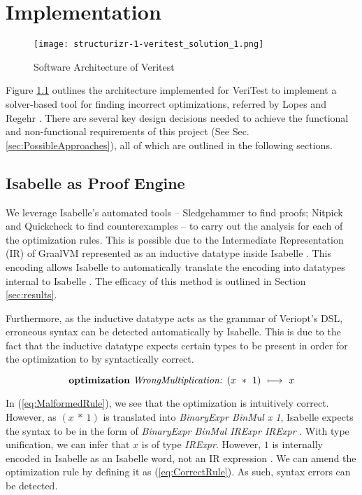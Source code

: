 \chapter{Implementation \label{sec:implementation}}

\begin{figure}[h]
    \centering
    \texttt{[image: structurizr-1-veritest\_solution\_1.png]}
    \caption{Software Architecture of Veritest}
    \label{fig:architecture}
\end{figure}

Figure \ref{fig:architecture} outlines the architecture implemented for VeriTest to implement a solver-based tool for finding incorrect optimizations,
referred by Lopes and Regehr \cite[p. 5]{CompilerOptimization}. There are several key design decisions needed to achieve the functional and 
non-functional requirements of this project (See Sec. \ref{sec:PossibleApproaches}), all of which are outlined in the following sections.

\section{Isabelle as Proof Engine}
\label{sec:ProofEngine}

We leverage Isabelle's automated tools -- Sledgehammer to find proofs; Nitpick and Quickcheck to find counterexamples --
to carry out the analysis for each of the optimization rules. This is possible due to the Intermediate 
Representation (IR) of GraalVM represented as an inductive datatype inside Isabelle \cite[Sec. 3]{ATVA21_GraalVM_IR_Semantics}. 
This encoding allows Isabelle to automatically translate the encoding into datatypes internal to Isabelle \cite{biendarra_ning_2024}.
The efficacy of this method is outlined in Section \ref{sec:results}.

Furthermore, as the inductive datatype acts as the grammar of Veriopt's DSL, erroneous syntax can be detected automatically by Isabelle.
This is due to the fact that the inductive datatype expects certain types to be present in order for the optimization to by syntactically correct.

\begin{equation}
    \text{\textbf{optimization} \emph{WrongMultiplication: \((x\ *\ 1)\ \longmapsto\ x\)}}
    \label{eq:MalformedRule}
\end{equation}

In (\ref{eq:MalformedRule}), we see that the optimization is intuitively correct. However, as \((x\ *\ 1)\) is translated into 
\emph{BinaryExpr BinMul x 1}, Isabelle expects the syntax to be in the form of \emph{BinaryExpr BinMul IRExpr IRExpr} 
\cite[Definition 1]{Term_Graph_Optimizations}. With type unification, we can infer that \(x\) is of type \emph{IRExpr}. However, \(1\) is 
internally encoded in Isabelle as an Isabelle word, not an IR expression \cite[Definition 2]{Term_Graph_Optimizations}. We can amend the 
optimization rule by defining it as (\ref{eq:CorrectRule}). As such, syntax errors can be detected.

